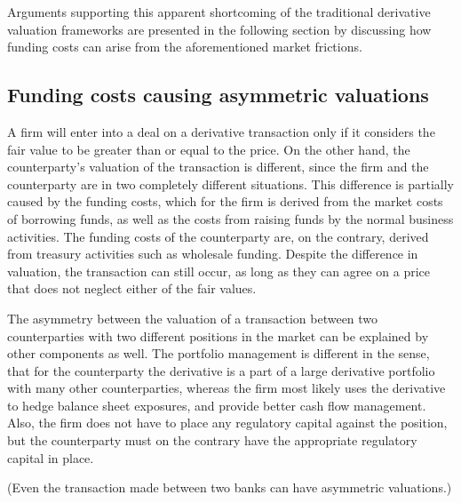\documentclass[../../../main.tex]{subfiles}
\begin{document}
        Arguments supporting this apparent shortcoming of the traditional derivative valuation frameworks are presented in the following section by discussing how funding costs can arise from the aforementioned market frictions.
    
    \subsection{Funding costs causing asymmetric valuations}
        A firm will enter into a deal on a derivative transaction
        only if it considers the fair value to be greater than or equal to the price.
        On the other hand, the counterparty's valuation of the transaction is different,
        since the firm and the counterparty are in two completely different situations.
        This difference is partially caused by the funding costs,
        which for the firm is derived from the market costs of borrowing funds,
        as well as the costs from raising funds by the normal business activities.
        The funding costs of the counterparty are, on the contrary, derived from treasury activities such as wholesale funding.
        Despite the difference in valuation, the transaction can still occur,
        as long as they can agree on a price that does not neglect either of the fair values.

        The asymmetry between the valuation of a transaction between two counterparties with two different positions in the market can be explained by other components as well.
        The portfolio management is different in the sense,
        that for the counterparty the derivative is a part of a large derivative portfolio with many other counterparties,
        whereas the firm most likely uses the derivative to hedge balance sheet exposures,
        and provide better cash flow management.
        Also, the firm does not have to place any regulatory capital against the position,
        but the counterparty must on the contrary have the appropriate regulatory capital in place.

        (Even the transaction made between two banks can have asymmetric valuations.)
\end{document}
